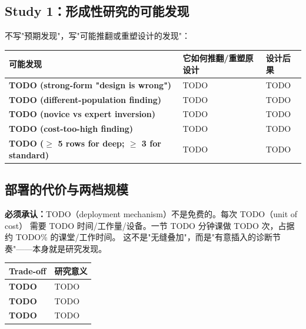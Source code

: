 
\subsection{Study 1：形成性研究的可能发现}

不写"预期发现"，写"可能推翻或重塑设计的发现"：

\begin{center}
\small
\begin{tabularx}{\textwidth}{>{\bfseries}p{}X X}
\toprule
可能发现 & 它如何推翻/重塑原设计 & 设计后果 \\
\midrule
TODO (strong-form "design is wrong") & TODO & TODO \\
TODO (different-population finding) & TODO & TODO \\
TODO (novice vs expert inversion) & TODO & TODO \\
TODO (cost-too-high finding) & TODO & TODO \\
TODO ($\geq$ 5 rows for deep; $\geq$ 3 for standard) & TODO & TODO \\
\bottomrule
\end{tabularx}
\end{center}


\subsection{部署的代价与两档规模}

\begin{redbox}
\textbf{必须承认：}TODO（deployment mechanism）不是免费的。每次 TODO（unit of cost）
需要 TODO 时间/工作量/设备。一节 TODO 分钟课做 TODO 次，占据约 TODO\% 的课堂/工作时间。
这不是"无缝叠加"，而是"有意插入的诊断节奏"——本身就是研究发现。
\end{redbox}

\begin{center}
\small
\begin{tabularx}{\textwidth}{>{\bfseries}p{}X}
\toprule
Trade-off & 研究意义 \\
\midrule
TODO & TODO \\
TODO & TODO \\
TODO & TODO \\
\bottomrule
\end{tabularx}
\end{center}

